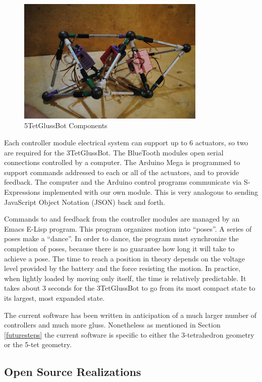 \documentclass[11pt]{article}
\begin{document}
\begin{figure}[!ht]
  \centering
    \includegraphics[width=0.8\textwidth]{figureslowres/5TegGlussBotOverview.jpg}
    \caption[5TetGlussBot Components]{5TetGlussBot Components}
      \label{5TetGlussBot}
\end{figure}


Each controller module electrical system can support up to 6 actuators, so two are required for the 3TetGlussBot.
The BlueTooth modules open serial connections controlled by a computer.
The Arduino Mega is programmed to support commands addressed to each or all of the actuators, and
to provide feedback. The computer and the Arduino control programs communicate via S-Expressions
implemented with our own module. This is very analogous to sending JavaScript Object Notation (JSON) back and forth.

Commands to and feedback from the controller modules are managed by an Emacs E-Lisp program.
This program organizes motion into ``poses''. A series of poses make a ``dance''.
In order to dance, the program must synchronize the completion of poses, because there is no
guarantee how long it will take to achieve a pose. The time to reach a position in theory
depends on the voltage level provided by the battery and the force resisting the motion.
In practice, when lightly loaded by moving only itself, the time is relatively predictable. It takes
about 3 seconds for the 3TetGlussBot to go from its most compact state to its largest, most expanded state.

The current software has been written in anticipation of a much larger number of controllers and much more gluss.
Nonetheless as mentioned in Section \ref{futuresteps} the current software is specific to either the 3-tetrahedron geometry or the
5-tet geometry.


\subsection{Open Source Realizations}
\end{document}

